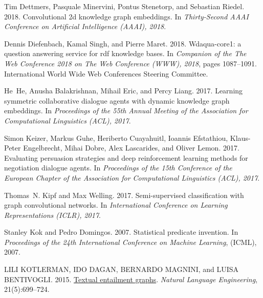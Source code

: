 \documentclass[11pt,a4paper]{article}
\begin{document}
\begin{thebibliography}{29}
Tim Dettmers, Pasquale Minervini, Pontus Stenetorp, and Sebastian Riedel. 2018.
\newblock Convolutional 2d knowledge graph embeddings.
\newblock In \emph{Thirty-Second AAAI Conference on Artificial Intelligence
  (AAAI), 2018}.

Dennis Diefenbach, Kamal Singh, and Pierre Maret. 2018.
\newblock Wdaqua-core1: a question answering service for rdf knowledge bases.
\newblock In \emph{Companion of the The Web Conference 2018 on The Web
  Conference (WWW), 2018}, pages 1087--1091. International World Wide Web
  Conferences Steering Committee.

He~He, Anusha Balakrishnan, Mihail Eric, and Percy Liang. 2017.
\newblock Learning symmetric collaborative dialogue agents with dynamic
  knowledge graph embeddings.
\newblock In \emph{Proceedings of the 55th Annual Meeting of the Association
  for Computational Linguistics (ACL), 2017}.

Simon Keizer, Markus Guhe, Heriberto Cuayahuitl, Ioannis Efstathiou,
  Klaus-Peter Engelbrecht, Mihai Dobre, Alex Lascarides, and Oliver Lemon.
  2017.
\newblock Evaluating persuasion strategies and deep reinforcement learning
  methods for negotiation dialogue agents.
\newblock In \emph{Proceedings of the 15th Conference of the European Chapter
  of the Association for Computational Linguistics (ACL), 2017}.

Thomas~N. Kipf and Max Welling. 2017.
\newblock Semi-supervised classification with graph convolutional networks.
\newblock In \emph{International Conference on Learning Representations (ICLR),
  2017}.

Stanley Kok and Pedro Domingos. 2007.
\newblock Statistical predicate invention.
\newblock In \emph{Proceedings of the 24th International Conference on Machine
  Learning}, (ICML), 2007.

LILI KOTLERMAN, IDO DAGAN, BERNARDO MAGNINI, and LUISA BENTIVOGLI. 2015.
\newblock \href {https://doi.org/10.1017/S1351324915000108} {Textual entailment
  graphs}.
\newblock \emph{Natural Language Engineering}, 21(5):699–724.


\end{thebibliography}
\end{document}
